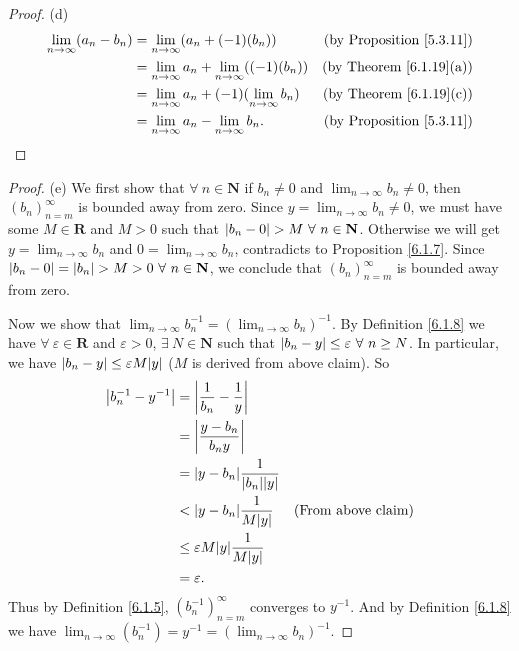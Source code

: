 \begin{proof}{(d)}
    \begin{align*}
        \lim_{n \to \infty} (a_n - b_n) & = \lim_{n \to \infty} (a_n + (-1)(b_n))                     & \text{(by Proposition \ref{5.3.11})} \\
                                        & = \lim_{n \to \infty} a_n + \lim_{n \to \infty} ((-1)(b_n)) & \text{(by Theorem \ref{6.1.19}(a))}  \\
                                        & = \lim_{n \to \infty} a_n + (-1)(\lim_{n \to \infty} b_n)   & \text{(by Theorem \ref{6.1.19}(c))}  \\
                                        & = \lim_{n \to \infty} a_n - \lim_{n \to \infty} b_n.        & \text{(by Proposition \ref{5.3.11})}
    \end{align*}
\end{proof}

\begin{proof}{(e)}
    We first show that \(\forall\ n \in \mathbf{N}\) if \(b_n \neq 0\) and \(\lim_{n \to \infty} b_n \neq 0\), then \((b_n)_{n = m}^\infty\) is bounded away from zero.
    Since \(y = \lim_{n \to \infty} b_n \neq 0\), we must have some \(M \in \mathbf{R}\) and \(M > 0\) such that \(\abs*{b_n - 0} > M \ \forall\ n \in \mathbf{N}\).
    Otherwise we will get \(y = \lim_{n \to \infty} b_n\) and \(0 = \lim_{n \to \infty} b_n\), contradicts to Proposition \ref{6.1.7}.
    Since \(\abs*{b_n - 0} = \abs*{b_n} > M > 0 \ \forall\ n \in \mathbf{N}\), we conclude that \((b_n)_{n = m}^\infty\) is bounded away from zero.

    Now we show that \(\lim_{n \to \infty} b_n^{-1} = (\lim_{n \to \infty} b_n)^{-1}\).
    By Definition \ref{6.1.8} we have \(\forall\ \varepsilon \in \mathbf{R}\) and \(\varepsilon > 0\), \(\exists\ N \in \mathbf{N}\) such that \(\abs*{b_n - y} \leq \varepsilon \ \forall\ n \geq N\).
    In particular, we have \(\abs*{b_n - y} \leq \varepsilon M\abs*{y}\) (\(M\) is derived from above claim).
    So
    \begin{align*}
        \abs*{b_n^{-1} - y^{-1}} & = \abs*{\frac{1}{b_n} - \frac{1}{y}}                                      \\
                                 & = \abs*{\frac{y - b_n}{b_n y}}                                            \\
                                 & = \abs*{y - b_n}\frac{1}{\abs*{b_n}\abs*{y}}                              \\
                                 & < \abs*{y - b_n}\frac{1}{M\abs*{y}}           & \text{(From above claim)} \\
                                 & \leq \varepsilon M\abs*{y}\frac{1}{M\abs*{y}}                             \\
                                 & = \varepsilon.
    \end{align*}
    Thus by Definition \ref{6.1.5}, \((b_n^{-1})_{n = m}^\infty\) converges to \(y^{-1}\).
    And by Definition \ref{6.1.8} we have \(\lim_{n \to \infty} (b_n^{-1}) = y^{-1} = (\lim_{n \to \infty} b_n)^{-1}\).
\end{proof}

